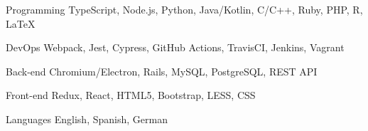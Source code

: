 

\begin{cvskills}

  \cvskill
    {Programming} %
    {TypeScript, Node.js, Python, Java/Kotlin, C/C++, Ruby, PHP, R, LaTeX} %

  \cvskill
    {DevOps} %
    {Webpack, Jest, Cypress, GitHub Actions, TravisCI, Jenkins, Vagrant} %

  \cvskill
    {Back-end} %
    {Chromium/Electron, Rails, MySQL, PostgreSQL, REST API} %

  \cvskill
    {Front-end} %
    {Redux, React, HTML5, Bootstrap, LESS, CSS} %

  \cvskill
    {Languages} %
    {English, Spanish, German} %

\end{cvskills}

